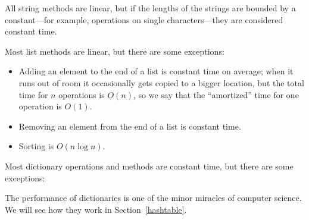 \documentclass[12pt]{book}
\theoremstyle{exercise}
\newcommand{\py}{\verb}%}
\begin{document}
All string methods are linear, but if the lengths of
the strings are bounded by a constant---for example, operations on single
characters---they are considered constant time.

Most list methods are linear, but there are some exceptions:

\begin{itemize}

\item Adding an element to the end of a list is constant time on
average; when it runs out of room it occasionally gets copied
to a bigger location, but the total time for $n$ operations
is $O(n)$, so we say that the ``amortized'' time for one
operation is $O(1)$.

\item Removing an element from the end of a list is constant time.

\item Sorting is $O(n \log n)$.

\end{itemize}

Most dictionary operations and methods are constant time, but
there are some exceptions:


The performance of dictionaries is one of the minor miracles of
computer science.  We will see how they work in
Section~\ref{hashtable}.
\end{document}
